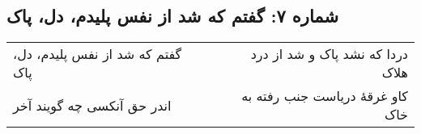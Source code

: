 \begin{center}
\section*{شماره ۷: گفتم که شد از نفس پلیدم، دل، پاک}
\label{sec:007}
\begin{longtable}{l p{0.5cm} r}
گفتم که شد از نفس پلیدم، دل، پاک
&&
دردا که نشد پاک و شد از درد هلاک
\\
اندر حق آنکسی چه گویند آخر
&&
کاو غرقهٔ دریاست جنب رفته به خاک
\\
\end{longtable}
\end{center}
